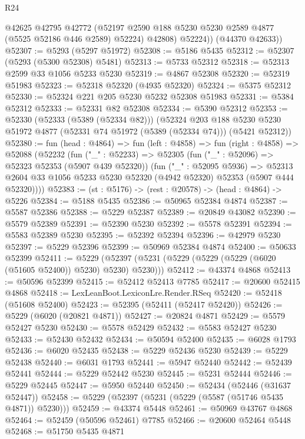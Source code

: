 \begin{lexlean}{R24}
\begin{coremodule}
            @42625
            @42795
            @42772
            (@52197 @2590 @188 @5230 @5230 @2589 @4877 (@5525 @52186 @446 @2589) @52224)
            @42808)
          @52224))
      (@44370 @42633))
@52307 := @5293 (@5297 @51972)
@52308 := @5186 @5435
@52312 := @52307 (@5293 (@5300 @52308) @5481)
@52313 := @5733 @52312
@52318 := @52313 @2599 @33 @1056 @5233 @5230
@52319 := @4867 @52308
@52320 := @52319 @51983
@52323 := @52318 @52320 (@4935 @52320)
@52324 := @5375 @52312
@52330 := @52324 @221 @205 @5230 @5232 @52308 @51983
@52331 := @5384 @52312
@52333 := @52331 @82 @52308
@52334 := @5390 @52312
@52353 := @52330
    (@52333 (@5389 (@52334 @82)))
    (@52324
      @203
      @188
      @5230
      @5230
      @51972
      @4877
      (@52331 @74 @51972 (@5389 (@52334 @74)))
      (@5421 @52312))
@52380 := fun (head : @4864) =>
  fun (left : @4858) =>
  fun (right : @4858) =>
  @52088
    (@52232
      (fun ("_" : @52233) =>
      @52305
        (fun ("_" : @52096) => @52323 @52353 (@5907 @439 @52320))
        (fun ("_" : @52095 @5936) =>
        @52313 @2604 @33 @1056 @5233 @5230 @52320 (@4942 @52320) @52353 (@5907 @444 @52320))))
@52383 := (st : @5176) -> (rest : @20578) -> (head : @4864) -> @5226
@52384 := @5188 @5435
@52386 := @50965 @52384 @4874
@52387 := @5587 @52386
@52388 := @5229 @52387
@52389 := @20849 @43082
@52390 := @5579 @52389
@52391 := @52390 @5230
@52392 := @5578 @52391
@52394 := @5583 @52389 @5230
@52395 := @52392 @52394
@52396 := @42979 @5230
@52397 := @5229 @52396
@52399 := @50969 @52384 @4874
@52400 := @50633 @52399
@52411 := @5229 (@52397 (@5231 (@5229 (@5229 (@5229 (@6020 (@51605 @52400)) @5230) @5230) @5230)))
@52412 := @43374 @4868
@52413 := @50596 @52399
@52415 := @52412 @52413 @7785
@52417 := @20600 @52415 @4868
@52418 := LexLeanBoot.LexiconLre.Render.RSeq
@52420 := @52418 (@51608 @52400)
@52423 := @52395 (@52411 (@52417 @52420))
@52426 := @5229 (@6020 (@20821 @4871))
@52427 := @20824 @4871
@52429 := @5579 @52427 @5230
@52430 := @5578 @52429
@52432 := @5583 @52427 @5230
@52433 := @52430 @52432
@52434 := @50594 @52400
@52435 := @6028 @1793
@52436 := @6020 @52435
@52438 := @5229 @52436 @5230
@52439 := @5229 @52438
@52440 := @6031 @1793
@52441 := @5947 @52440
@52442 := @52439 @52441
@52444 := @5229 @52442 @5230
@52445 := @5231 @52444
@52446 := @5229 @52445
@52447 := @5950 @52440
@52450 := @52434 (@52446 (@31637 @52447))
@52458 := @5229 (@52397 (@5231 (@5229 (@5587 (@51746 @5435 @4871)) @5230)))
@52459 := @43374 @5448
@52461 := @50969 @43767 @4868
@52464 := @52459 (@50596 @52461) @7785
@52466 := @20600 @52464 @5448
@52468 := @51750 @5435 @4871

\end{coremodule}
\end{lexlean}
